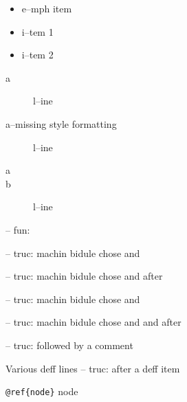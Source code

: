 \documentclass{book}
\begin{document}
\begin{itemize}[label=\emph{} after emph]
\item e--mph item
\end{itemize}

\begin{itemize}[label=\textbullet{} a--n itemize line]
\item i--tem 1
\item i--tem 2
\end{itemize}

\begin{description}
\item[a]
l--ine
\end{description}

\begin{description}
\item[a--missing style formatting]
l--ine
\end{description}

\begin{description}
\item[a]
%
%
\item[b]
%
l--ine
\end{description}

\hbox{}-- fun: 


\hbox{}-- truc: machin bidule chose and


%
\hbox{}-- truc: machin bidule chose and  after


%
\hbox{}-- truc: machin bidule chose and 


%
\hbox{}-- truc: machin bidule chose and and after


%
\hbox{}-- truc: followed by a comment


%
Various deff lines
\hbox{}-- truc: after a deff item


%

\texttt{@ref\{node\}} node
\end{document}
